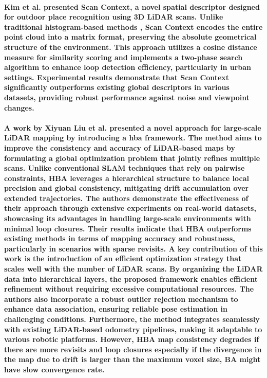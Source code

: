 \paragraph{\textnormal{Kim et al. \cite{kim2018scan} presented Scan Context, a novel spatial descriptor designed for outdoor place recognition using 3D LiDAR scans. Unlike traditional histogram-based methods \cite[]{himstedt2014large, muhammad2011loop, wohlkinger2011ensemble}, Scan Context encodes the entire point cloud into a matrix format, preserving the absolute geometrical structure of the environment. This approach utilizes a cosine distance measure for similarity scoring and implements a two-phase search algorithm to enhance loop detection efficiency, particularly in urban settings. Experimental results demonstrate that Scan Context significantly outperforms existing global descriptors in various datasets, providing robust performance against noise and viewpoint changes.}}


\paragraph{\textnormal{A work by Xiyuan Liu et al. \cite{10024300} presented a novel approach for large-scale LiDAR mapping by introducing a \gls{hba} framework. The method aims to improve the consistency and accuracy of LiDAR-based maps by formulating a global optimization problem that jointly refines multiple scans. Unlike conventional SLAM techniques that rely on pairwise constraints, HBA leverages a hierarchical structure to balance local precision and global consistency, mitigating drift accumulation over extended trajectories. The authors demonstrate the effectiveness of their approach through extensive experiments on real-world datasets, showcasing its advantages in handling large-scale environments with minimal loop closures. Their results indicate that HBA outperforms existing methods in terms of mapping accuracy and robustness, particularly in scenarios with sparse revisits. A key contribution of this work is the introduction of an efficient optimization strategy that scales well with the number of LiDAR scans. By organizing the LiDAR data into hierarchical layers, the proposed framework enables efficient refinement without requiring excessive computational resources. The authors also incorporate a robust outlier rejection mechanism to enhance data association, ensuring reliable pose estimation in challenging conditions. Furthermore, the method integrates seamlessly with existing LiDAR-based odometry pipelines, making it adaptable to various robotic platforms. However, HBA map consistency degrades if there are more revisits and loop closures especially if the divergence in the map due to drift is larger than the maximum voxel size, BA might have slow convergence rate.}}



